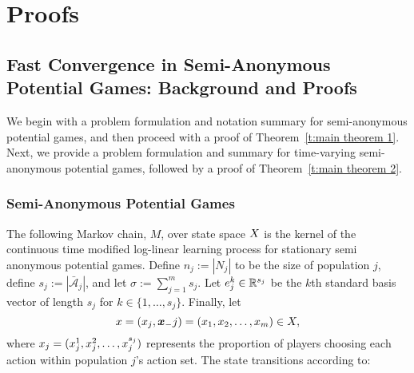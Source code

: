 \chapter{Proofs}

\section{Fast Convergence in Semi-Anonymous Potential Games: Background and Proofs}

We begin with a problem formulation and notation summary for semi-anonymous potential games, and then proceed with a proof of Theorem~\ref{t:main theorem 1}. Next, we provide a problem formulation and summary for time-varying semi-anonymous potential games, followed by a proof of Theorem~\ref{t:main theorem 2}.

\subsection{Semi-Anonymous Potential Games}\label{a:M defn}
The following Markov chain, $M$, over state space $X$ is the kernel of the continuous time modified log-linear learning process for stationary semi anonymous potential games.  Define $n_j := |N_j|$ to be the size of population $j$, define $s_j:= |\bar{\mathcal{A}}_j|$, and let $\sigma := \sum_{j = 1}^m s_j.$ Let $e_j^k \in \mathbb{R}^{s_j}$ be the $k$th standard basis vector of length $s_j$ for $k\in \{1,\ldots,s_j\}$.      Finally, let $$x = (x_j,{\boldsymbol{ x }}_-j) = (x_1,x_2,\ldots,x_m)\in X,$$
where $x_j = (x_j^1,x_j^2,\ldots,x_j^{s_j})$ represents the proportion of players choosing each action within population $j$'s action set.  The state transitions according to:
